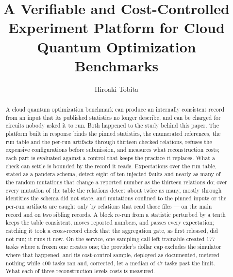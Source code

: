 \documentclass[acmsmall,screen,review]{acmart}
\begin{document}
\title{A Verifiable and Cost-Controlled Experiment Platform for Cloud Quantum Optimization Benchmarks}
\author{Hiroaki Tobita}
\begin{abstract}
A cloud quantum optimization benchmark can produce an internally consistent record from an input that its published statistics no longer describe, and can be charged for circuits nobody asked it to run. Both happened to the study behind this paper. The platform built in response binds the pinned statistics, the enumerated references, the run table and the per-run artifacts through thirteen checked relations, refuses the expensive configurations before submission, and measures what reconstruction costs; each part is evaluated against a control that keeps the practice it replaces. What a check can settle is bounded by the record it reads. Expectations over the run table, stated as a pandera schema, detect eight of ten injected faults and nearly as many of the random mutations that change a reported number as the thirteen relations do; over every mutation of the table the relations detect about twice as many, mostly through identities the schema did not state, and mutations confined to the pinned inputs or the per-run artifacts are caught only by relations that read those files --- on the main record and on two sibling records. A block re-run from a statistic perturbed by a tenth keeps the table consistent, moves reported numbers, and passes every expectation; catching it took a cross-record check that the aggregation gate, as first released, did not run; it runs it now. On the service, one sampling call left trainable created 177 tasks where a frozen one creates one; the provider's dollar cap excludes the simulator where that happened, and its cost-control sample, deployed as documented, metered nothing while 400 tasks ran and, corrected, let a median of 47 tasks past the limit. What each of three reconstruction levels costs is measured.
\end{abstract}

\maketitle
\end{document}
